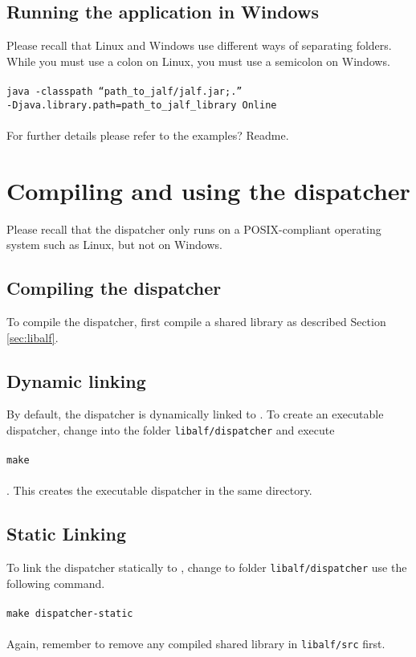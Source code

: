 \subsection*{Running the application in Windows}
Please recall that Linux and Windows use different ways of separating folders. While you must use a colon on Linux, you must use a semicolon on Windows. 
\\ \\
\texttt{java -classpath ``path\_to\_jalf/jalf.jar;.'' \\ \hspace*{25pt} -Djava.library.path=path\_to\_jalf\_library Online}
\\ \\
For further details please refer to the examples? Readme.

\section{Compiling and using the dispatcher}
Please recall that the dispatcher only runs on a POSIX-compliant operating system such as Linux, but not on Windows.

\subsection{Compiling the dispatcher}
To compile the dispatcher, first compile a shared \libalf library as described Section \ref{sec:libalf}.
\subsection*{Dynamic linking}
By default, the dispatcher is dynamically linked to \libalf. To create an executable dispatcher, change into the folder \texttt{libalf/dispatcher} and execute \\ \\ \texttt{make} \\ \\. This creates the executable dispatcher in the same directory. 
\subsection*{Static Linking}
To link the dispatcher statically to \libalf, change to folder \texttt{libalf/dispatcher} use the following command.
\\ \\ 
\texttt{make dispatcher-static}
\\ \\
Again, remember to remove any compiled shared library in \texttt{libalf/src} first.

